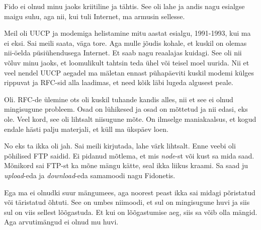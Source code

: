 
Fido ei olnud minu jaoks kriitiline ja tähtis. See oli lahe ja andis nagu esialgse maigu suhu, aga nii, kui tuli Internet, ma armusin sellesse.


Meil oli  UUCP ja modemiga helistamine mitu aastat esialgu, 1991-1993, kui ma ei eksi. Sai meili saata, väga tore. Aga mulle jõudis kohale, et kuskil on olemas nii-öelda püsiühendusega Internet. Et saab nagu reaalajas kuidagi. See oli nii võluv minu jaoks, et loomulikult tahtsin teda ühel või teisel moel uurida. Nii et veel nendel UUCP aegadel ma mäletan ennast pühapäeviti kuskil modemi külges rippuvat ja RFC-sid alla laadimas, et need kõik läbi lugeda algusest peale.


Oli. RFC-de ülemine ots oli kuskil tuhande kandis alles, nii et see ei olnud mingisugune probleem. Osad on lühikesed ja osad on mõttetud ja nii edasi, eks ole. Veel kord, see oli lihtsalt niisugune mõte. On ilmselge maniakaalsus, et kogud endale hästi palju materjali, et küll ma ükspäev loen.


No eks ta ikka oli jah. Sai meili kirjutada, lahe värk lihtsalt. Enne veebi oli põhilised FTP saidid. Ei pidanud mõtlema, et mis \emph{node}-st või kust sa mida saad.  Mõnikord sai FTP-st ka mõne mängu kätte, seal ikka liikus kraami. Sa saad ju \emph{upload}-eda ja \emph{download}-eda samamoodi nagu Fidonetis. 


Ega ma ei olnudki suur mängumees,  aga noorest peast ikka sai midagi põristatud või täristatud õhtuti. See on umbes niimoodi, et sul on mingisugune huvi ja siis sul on viis sellest lõõgastuda. Et kui on lõõgastumise aeg, siis sa võib olla mängid. Aga arvutimängud ei olnud mu huvi. 

